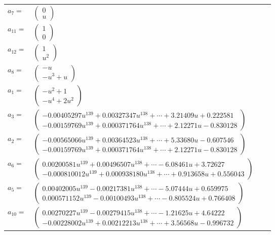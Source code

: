\documentclass[1p]{elsarticle_modified}
\theoremstyle{definition}
\begin{document}
\begin{tabular}{m{7pt} m{180pt} m{7pt} m{180pt} }
\flushright $a_{7}=$&$\begin{pmatrix}0\\u\end{pmatrix}$ \\
\flushright $a_{11}=$&$\begin{pmatrix}1\\0\end{pmatrix}$ \\
\flushright $a_{12}=$&$\begin{pmatrix}1\\u^2\end{pmatrix}$ \\
\flushright $a_{8}=$&$\begin{pmatrix}- u\\- u^3+u\end{pmatrix}$ \\
\flushright $a_{1}=$&$\begin{pmatrix}- u^2+1\\- u^4+2 u^2\end{pmatrix}$ \\
\flushright $a_{3}=$&$\begin{pmatrix}-0.00405297 u^{139}+0.00327347 u^{138}+\cdots+3.21409 u+0.222581\\-0.00159769 u^{139}+0.000371764 u^{138}+\cdots+2.12271 u-0.830128\end{pmatrix}$ \\
\flushright $a_{2}=$&$\begin{pmatrix}-0.00565066 u^{139}+0.00364523 u^{138}+\cdots+5.33680 u-0.607546\\-0.00159769 u^{139}+0.000371764 u^{138}+\cdots+2.12271 u-0.830128\end{pmatrix}$ \\
\flushright $a_{6}=$&$\begin{pmatrix}0.00200581 u^{139}+0.00496507 u^{138}+\cdots-6.08461 u+3.72627\\-0.000810012 u^{139}+0.000938180 u^{138}+\cdots+0.913658 u+0.556043\end{pmatrix}$ \\
\flushright $a_{5}=$&$\begin{pmatrix}0.00402005 u^{139}-0.00217381 u^{138}+\cdots-5.07444 u+0.659975\\0.000571152 u^{139}-0.00100493 u^{138}+\cdots-0.805524 u+0.766408\end{pmatrix}$ \\
\flushright $a_{10}=$&$\begin{pmatrix}0.00270227 u^{139}-0.00279415 u^{138}+\cdots-1.21625 u+4.64222\\-0.00228002 u^{139}+0.00212213 u^{138}+\cdots+3.56568 u-0.996732\end{pmatrix}$ \\

\end{tabular}
\end{document}
